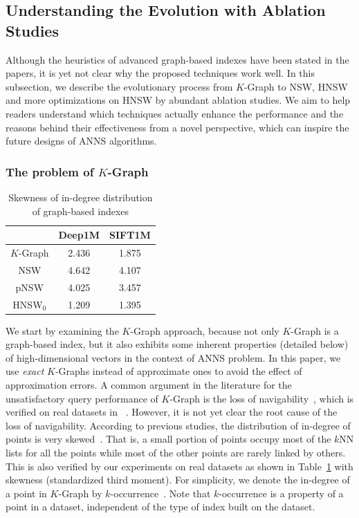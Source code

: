 \documentclass[11pt]{article}
\begin{document}
\subsection{Understanding the Evolution with Ablation Studies}
Although the heuristics of advanced graph-based indexes have been stated in the papers, it is yet not clear why the proposed techniques work well.
In this subsection, we describe the evolutionary process from $K$-Graph to NSW, HNSW and more optimizations on HNSW by abundant ablation studies.
We aim to help readers understand which techniques actually enhance the performance and the reasons behind their effectiveness from a novel perspective, which can inspire the future designs of ANNS algorithms.

\subsubsection{The problem of $K$-Graph}
\label{zeyu_sec:k-graph}
\begin{table}
        \centering
        \footnotesize
    \caption{Skewness of in-degree distribution of graph-based indexes}
    \label{zeyu_tab:skewness}
    \begin{tabular}{ccc}\\
    \toprule
              & Deep1M & SIFT1M \\ \midrule
    $K$-Graph & 2.436  & 1.875  \\ \midrule
    NSW       & 4.642  & 4.107  \\ \midrule
    pNSW      & 4.025  & 3.457  \\ \midrule
    HNSW$_0$   & 1.209  & 1.395  \\ \bottomrule
    \end{tabular}
\end{table}
We start by examining the $K$-Graph approach, because not only $K$-Graph is a graph-based index, but it also exhibits some inherent properties (detailed below) of high-dimensional vectors in the context of ANNS problem. 
In this paper, we use \emph{exact} $K$-Graphs instead of approximate ones to avoid the effect of approximation errors.
A common argument in the literature for the unsatisfactory query performance of $K$-Graph is the loss of navigability~\cite{hnsw,wang-survey}, which is verified on real datasets in ~\cite{k-regular}.
However, it is not yet clear the root cause of the loss of navigability.
According to previous studies, the distribution of in-degree of points is very skewed~\cite{hub}.
That is, a small portion of points occupy most of the $k$NN lists for all the points while most of the other points are rarely linked by others.
This is also verified by our experiments on real datasets as shown in Table~\ref{zeyu_tab:skewness} with skewness (standardized third moment).
For simplicity, we denote the in-degree of a point in $K$-Graph by $k$-occurrence~\cite{hub}.
Note that $k$-occurrence is a property of a point in a dataset, independent of the type of index built on the dataset.
\end{document}
